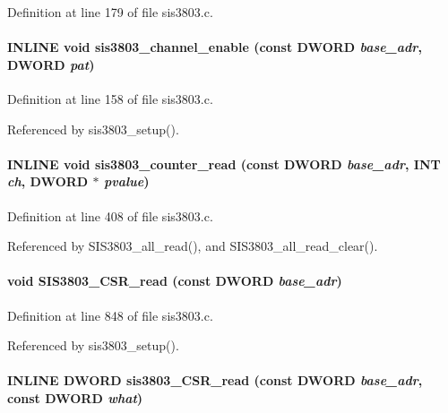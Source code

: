 Definition at line 179 of file sis3803.c.
\paragraph[{sis3803\_\-channel\_\-enable}]{\setlength{\rightskip}{0pt plus 5cm}INLINE void sis3803\_\-channel\_\-enable (const {\bf DWORD} {\em base\_\-adr}, \/  {\bf DWORD} {\em pat})}\hfill\label{sis3803_8c_a181506997a0827fb52f55b8901f3caa9}


Definition at line 158 of file sis3803.c.

Referenced by sis3803\_\-setup().
\paragraph[{sis3803\_\-counter\_\-read}]{\setlength{\rightskip}{0pt plus 5cm}INLINE void sis3803\_\-counter\_\-read (const {\bf DWORD} {\em base\_\-adr}, \/  {\bf INT} {\em ch}, \/  {\bf DWORD} $\ast$ {\em pvalue})}\hfill\label{sis3803_8c_a9d83689c8ccff69c2218e584f41b3344}


Definition at line 408 of file sis3803.c.

Referenced by SIS3803\_\-all\_\-read(), and SIS3803\_\-all\_\-read\_\-clear().
\paragraph[{SIS3803\_\-CSR\_\-read}]{\setlength{\rightskip}{0pt plus 5cm}void SIS3803\_\-CSR\_\-read (const {\bf DWORD} {\em base\_\-adr})}\hfill\label{sis3803_8c_afa74b8645c6fc7aa512834be5f367cd8}


Definition at line 848 of file sis3803.c.

Referenced by sis3803\_\-setup().
\paragraph[{sis3803\_\-CSR\_\-read}]{\setlength{\rightskip}{0pt plus 5cm}INLINE {\bf DWORD} sis3803\_\-CSR\_\-read (const {\bf DWORD} {\em base\_\-adr}, \/  const {\bf DWORD} {\em what})}\hfill\label{sis3803_8c_a641d45557f8638d028222e095ce39875}


